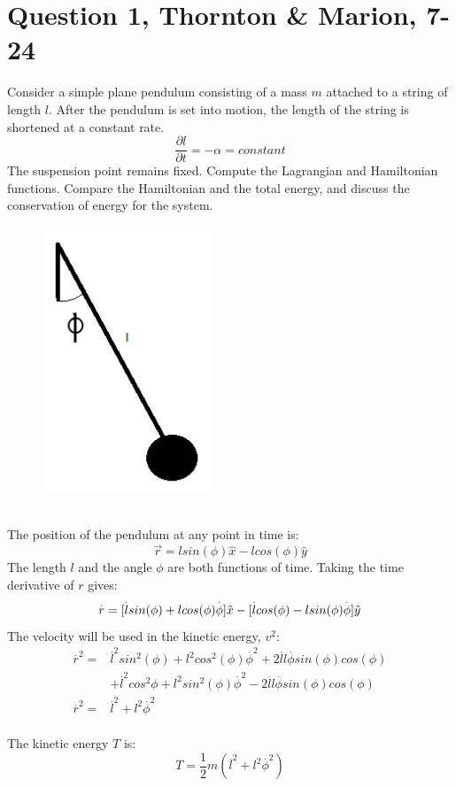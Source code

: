 \documentclass[a4paper,12pt]{article}
\newcommand{\V}[1]{\ensuremath{\vec{#1}}}
\newcommand{\F}[2]{\ensuremath{\frac{#1}{#2}}}
\newcommand{\vel}[1]{\overset{.}{#1}}
\begin{document}
\section*{Question 1, Thornton \& Marion, 7-24}

Consider a simple plane pendulum consisting of a mass $m$ attached to a string of length $l$. After the pendulum is set into motion, the length of the string is shortened at a constant rate. \[\F{\partial{l}}{\partial{t}}=-\alpha=constant\] The suspension point remains fixed. Compute the Lagrangian and Hamiltonian functions. Compare the Hamiltonian and the total energy, and discuss the conservation of energy for the system.
\\
\begin{figure}
\centering
\includegraphics[width=2in]{Pendulum.png}
\end{figure}\\
The position of the pendulum at any point in time is:
\[\V{r}=lsin(\phi)\hat{x}-lcos(\phi)\hat{y}\]
The length $l$ and the angle $\phi$ are both functions of time. Taking the time derivative of $r$ gives:
\[\vel{r}=[\vel{l}sin(\phi)+lcos(\phi)\vel{\phi}]\hat{x}-[\vel{l}cos(\phi)-lsin(\phi)\vel{\phi}]\hat{y}\\\]
The velocity will be used in the kinetic energy, $v^2$:
\begin{align*}
\vel{r}^2=&\vel{l}^2sin^2(\phi)+l^2cos^2(\phi)\vel{\phi}^2+2\vel{l}l\vel{\phi}sin(\phi)cos(\phi)\\
&+\vel{l}^2cos^2{\phi}+l^2sin^2(\phi)\vel{\phi}^2-2\vel{l}l\vel{\phi}sin(\phi)cos(\phi)\\
\vel{r}^2=&\vel{l}^2+l^2\vel{\phi}^2
\end{align*}\\
The kinetic energy $T$ is:
\[T=\F{1}{2}m(\vel{l}^2+l^2\vel{\phi}^2)\]
\end{document}
